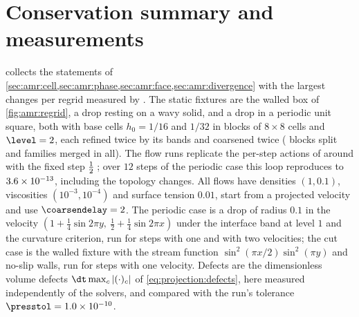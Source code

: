 \section{Conservation summary and measurements}\label{sec:amr:measurements}
 collects the statements of
\cref{sec:amr:cell,sec:amr:phase,sec:amr:face,sec:amr:divergence} with the
largest changes per regrid measured by
. The static fixtures are the walled
box of \cref{fig:amr:regrid}, a drop resting on a
wavy solid, and a drop in a periodic unit square, both with base cells
$h_0=1/16$ and $1/32$ in blocks of $8\times8$ cells and $\level=2$, each
refined twice by its bands and coarsened twice
(\chkAmrRefinedBlocks{} blocks split and \chkAmrCoarsenedFamilies{} families
merged in all). The flow runs replicate the per-step actions of
 around  with the fixed step
$\frac{1}{2}\,$;
over $12$ steps of the periodic case this loop reproduces 
to $3.6\times10^{-13}$, including the topology changes. All flows have
densities $(1,0.1)$, viscosities $(10^{-3},10^{-4})$ and surface tension
$0.01$, start from a projected velocity and use $\coarsendelay=2$. The
periodic case is a drop of radius $0.1$ in the velocity
$(1+\tfrac14\sin2\pi y,\ \tfrac12+\tfrac14\sin2\pi x)$ under the interface
band at level $1$ and the curvature criterion, run for \chkAmrFlowSteps{}
steps with one and with two velocities; the cut case is the walled fixture
with the stream function $\sin^2(\pi x/2)\sin^2(\pi y)$ and no-slip walls,
run for \chkAmrFlowCutSteps{} steps with one velocity. Defects are the
dimensionless volume defects $\dt\max_c\abs{(\cdot)_c}$ of
\cref{eq:projection:defects}, here measured independently of the solvers, and
compared with the run's tolerance $\presstol=\chkAmrFlowTolerance$.

